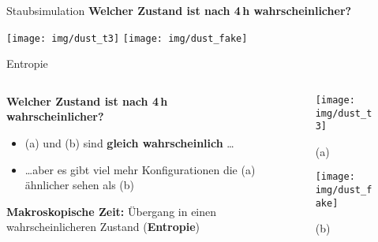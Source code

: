 \begin{frame}{Staubsimulation}
    \centering
    \textbf{Welcher Zustand ist nach 4\,h wahrscheinlicher?}

    \vspace{5mm}
    \texttt{[image: img/dust\_t3]} 
    \hspace{5mm} 
    \texttt{[image: img/dust\_fake]} 

    \vspace{5mm}
\end{frame}

\begin{frame}{Entropie}
    \begin{columns}
        \begin{column}{.7\textwidth}
            \textbf{Welcher Zustand ist nach 4\,h wahrscheinlicher?}
            \begin{itemize}
                \item (a) und (b) sind \textbf{gleich wahrscheinlich} \ldots
                \item \ldots aber es gibt viel mehr Konfigurationen die (a) ähnlicher sehen als (b)
            \end{itemize}
            \begin{center}
                \scalebox{2.}{$\downarrow$}

                \vspace{5mm}
                \textbf{Makroskopische Zeit:} Übergang in einen wahrscheinlicheren Zustand (\textbf{Entropie})
            \end{center}
        \end{column}
        \begin{column}{.3\textwidth}
            \centering
            \begin{figure}
                \texttt{[image: img/dust\_t3]}
                \caption{(a)}
            \end{figure}

            \begin{figure}
                \texttt{[image: img/dust\_fake]}
                \caption{(b)}
            \end{figure}
        \end{column}
    \end{columns}
\end{frame}

